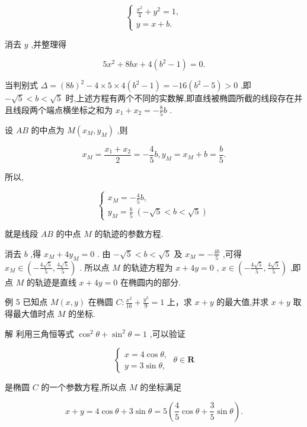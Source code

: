 \documentclass[10pt]{article}
\begin{document}
\[
\left\{  \begin{array}{l} \frac{{x}^{2}}{4} + {y}^{2} = 1, \\  y = x + b. \end{array}\right.
\]

消去 \(y\) ,并整理得

\[
5{x}^{2} + {8bx} + 4\left( {{b}^{2} - 1}\right)  = 0.
\]

当判别式 \(\Delta  = {\left( 8b\right) }^{2} - 4 \times  5 \times  4\left( {{b}^{2} - 1}\right)  =  - {16}\left( {{b}^{2} - 5}\right)  > 0\) ,即 \(- \sqrt{5} < b < \sqrt{5}\) 时,上述方程有两个不同的实数解,即直线被椭圆所截的线段存在并且线段两个端点横坐标之和为 \({x}_{1} + {x}_{2} =  - \frac{8}{5}b\) .

设 \({AB}\) 的中点为 \(M\left( {{x}_{M},{y}_{M}}\right)\) ,则

\[
{x}_{M} = \frac{{x}_{1} + {x}_{2}}{2} =  - \frac{4}{5}b,{y}_{M} = {x}_{M} + b = \frac{b}{5}.
\]

所以,

\[
\left\{  \begin{array}{l} {x}_{M} =  - \frac{4}{5}b, \\  {y}_{M} = \frac{b}{5}\;\left( {-\sqrt{5} < b < \sqrt{5}}\right)  \end{array}\right.
\]

就是线段 \({AB}\) 的中点 \(M\) 的轨迹的参数方程.

消去 \(b\) ,得 \({x}_{M} + 4{y}_{M} = 0\) . 由 \(- \sqrt{5} < b < \sqrt{5}\) 及 \({x}_{M} =  - \frac{4b}{5}\) ,可得 \({x}_{M} \in  \left( {-\frac{4\sqrt{5}}{5},\frac{4\sqrt{5}}{5}}\right)\) . 所以点 \(M\) 的轨迹方程为 \(x + {4y} = 0\) , \(x \in  \left( {-\frac{4\sqrt{5}}{5},\frac{4\sqrt{5}}{5}}\right)\) ,即点 \(M\) 的轨迹是直线 \(x + {4y} = 0\) 在椭圆内的部分.

例 5 已知点 \(M\left( {x,y}\right)\) 在椭圆 \(C : \frac{{x}^{2}}{16} + \frac{{y}^{2}}{9} = 1\) 上，求 \(x + y\) 的最大值,并求 \(x + y\) 取得最大值时点 \(M\) 的坐标.

解 利用三角恒等式 \({\cos }^{2}\theta  + {\sin }^{2}\theta  = 1\) ,可以验证

\[
\left\{  {\begin{array}{l} x = 4\cos \theta , \\  y = 3\sin \theta , \end{array}\;\theta  \in  \mathbf{R}}\right.
\]

是椭圆 \(C\) 的一个参数方程,所以点 \(M\) 的坐标满足

\[
x + y = 4\cos \theta  + 3\sin \theta  = 5\left( {\frac{4}{5}\cos \theta  + \frac{3}{5}\sin \theta }\right) .
\]
\end{document}
